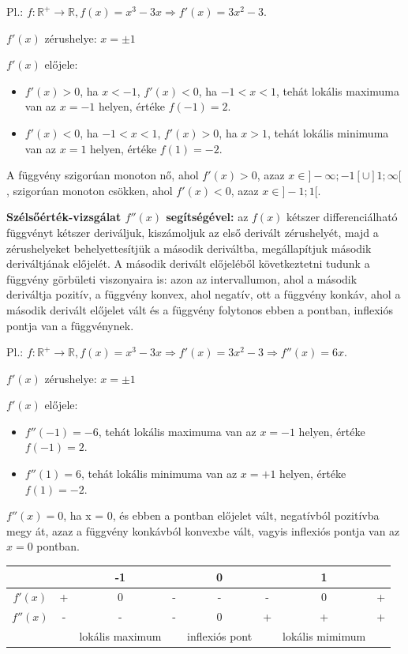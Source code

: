 \documentclass[12pt,a4paper]{article}
\begin{document}
Pl.: $f:\mathbb{R}^+\to \mathbb{R}, f(x)=x^3-3x\Rightarrow f'(x)=3x^2-3$.

$f'(x)$ zérushelye: $x=\pm 1$

$f'(x)$ előjele:
\begin{itemize}
\item $f'(x)>0$, ha $x<-1$, $f'(x)<0$, ha $-1<x<1$, tehát lokális maximuma van az $x = -1$ helyen, értéke $f(-1) = 2$.
\item $f'(x)<0$, ha $-1<x<1$, $f'(x)>0$, ha $x>1$, tehát lokális minimuma van az $x = 1$ helyen, értéke $f(1) = -2$.
\end{itemize}



A függvény szigorúan monoton nő, ahol $f'(x) > 0$, azaz $x \in ]-\infty; -1[ \cup ]1; \infty[$, szigorúan monoton csökken, ahol $f'(x) < 0$, azaz $x \in ]-1; 1[$.

\textbf{Szélsőérték-vizsgálat $f''(x)$ segítségével:} az $f(x)$ kétszer differenciálható függvényt kétszer deriváljuk, kiszámoljuk az első derivált zérushelyét, majd a zérushelyeket behelyettesítjük a második deriváltba, megállapítjuk második deriváltjának előjelét. A második derivált előjeléből következtetni tudunk a függvény görbületi viszonyaira is: azon az intervallumon, ahol a második deriváltja pozitív, a függvény konvex, ahol negatív, ott a függvény konkáv, ahol a második derivált előjelet vált és a függvény folytonos ebben a pontban, inflexiós pontja van a függvénynek.

Pl.: $f:\mathbb{R}^+\to \mathbb{R}, f(x)=x^3-3x\Rightarrow f'(x)=3x^2-3\Rightarrow f''(x)=6x$.

$f'(x)$ zérushelye: $x=\pm 1$

$f'(x)$ előjele:
\begin{itemize}
\item $f''(-1) = -6$, tehát lokális maximuma van az $x = -1$ helyen, értéke $f(-1) = 2$.
\item $f''(1) = 6$, tehát lokális minimuma van az $x = +1$ helyen, értéke $f(1) = -2$.
\end{itemize}
$f''(x) = 0$, ha x = 0, és ebben a pontban előjelet vált, negatívból pozitívba megy át, azaz a függvény konkávból konvexbe vált, vagyis inflexiós pontja van az $x = 0$ pontban.
\newpage

\begin{tabular}{|c|c|c|c|c|c|c|c|}
\hline 
 &  & -1 &  & 0 &  & 1 &  \\ 
\hline 
$f'(x)$ & + & 0 & - & - & - & 0 & + \\ 
\hline 
$f''(x)$ & - & - & - & 0 & + & + & + \\ 
\hline 
 &  & lokális maximum &  & inflexiós pont &  & lokális mimimum &  \\ 
\hline 
\end{tabular} 
\end{document}
